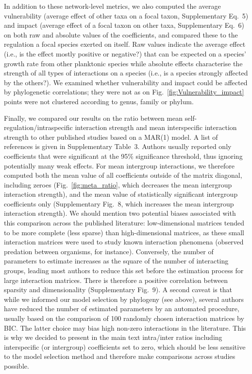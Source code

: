 \documentclass[9pt,twocolumn,twoside,lineno]{pnas-new}
\begin{document}
{In addition to these network-level metrics, we also computed the average
vulnerability (average effect of other taxa on a focal taxon, Supplementary
Eq.~5) and impact (average effect of a focal taxon on other taxa,
Supplementary Eq.~6) on both raw and absolute values of the coefficients,
and compared these to the regulation a focal species exerted on itself.
Raw values indicate the average effect (i.e., is the effect mostly
positive or negative?) that can be expected on a species' growth rate
from other planktonic species while absolute effects characterise
the strength of all types of interactions on a species (i.e., is a
species strongly affected by the others?). We examined whether vulnerability
and impact could be affected by phylogenetic correlations; they were
not as on Fig.~\ref{fig:Vulnerability_impact} points were not clustered
according to genus, family or phylum.

Finally, we compared our results on the ratio between mean self-regulation/intraspecific
interaction strength and mean interspecific interaction strength to
other published studies based on a MAR(1) model. A list of references
is given in Supplementary Table~3. Authors usually reported only
coefficients that were significant at the 95\% significance threshold,
thus ignoring potentially many weak effects. For mean intergroup interactions,
we therefore computed both the mean value of all coefficients outside
of the matrix diagonal, including zeroes (Fig.~\ref{fig:meta_ratio},
which decreases the mean intergroup interaction strength), and the
mean value of statistically significant intergroup coefficients only
(Supplementary Fig.~8, which increases the mean intergroup interaction
strength). We should mention two potential biases associated with
this comparison across the published literature: low-dimensional matrices
tended to be more complete (less sparse) than high-dimensional matrices,
as these small interaction matrices were used to study known interaction
phenomena (observed predation between organisms, for instance). Conversely,
the number of parameters to estimate increases as the square of the
number of interacting groups, leading most authors to reduce this
set before the estimation process for large interaction matrices.
There is therefore a positive correlation between sparsity and dimensionality
(Supplementary Fig.~9). A second caveat is that while we informed
our model selection by phylogeny (see above), several authors have
reduced the number of estimated parameters by an automated procedure,
usually based on the comparison of 100 randomly chosen interaction
matrices by BIC\cite{ives_estimating_2003}. The latter choice
may bias high non-zero interactions in the literature. This is why
we decided to present in the main text intra/inter ratios including
interspecific (or intergroup) coefficients set to zero, which should
be less sensitive to the model selection method and therefore make
comparisons across studies possible.}
\end{document}
